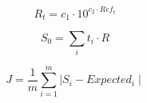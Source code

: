 \documentclass{article}
\begin{document}
	\begin{equation}
		R_t = c_1 \cdot 10 ^ {c_2 \cdot Ref_t}
	\end{equation}

	\begin{equation}
		S_0 = \sum_i t_i \cdot R
	\end{equation}

	\begin{equation}
		J = \frac{1}{m}\sum_{i=1}^{m}{\mid S_i - Expected_i\mid}
	\end{equation}
\end{document}
